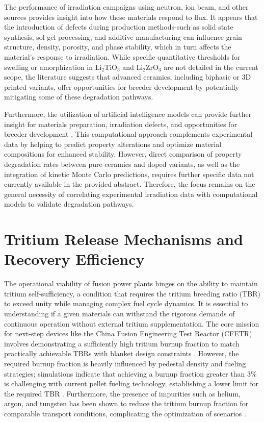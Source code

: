 \documentclass[review,12pt,a4paper]{elsarticle}
\begin{document}
\textcolor{medconf}{The performance of irradiation campaigns using neutron, ion beam, and other sources provides insight into how these materials respond to flux. It appears that the introduction of defects during production methods-such as solid state synthesis, sol-gel processing, and additive manufacturing-can influence grain structure, density, porosity, and phase stability, which in turn affects the material's response to irradiation. While specific quantitative thresholds for swelling or amorphization in $\mathrm{Li}_2\mathrm{TiO}_3$ and $\mathrm{Li}_2\mathrm{ZrO}_3$ are not detailed in the current scope, the literature suggests that advanced ceramics, including biphasic or 3D printed variants, offer opportunities for breeder development by potentially mitigating some of these degradation pathways.}

\textcolor{highconf}{Furthermore, the utilization of artificial intelligence models can provide further insight for materials preparation, irradiation defects, and opportunities for breeder development \citep{ruegsegger_scoping_2023}. This computational approach complements experimental data by helping to predict property alterations and optimize material compositions for enhanced stability. However, direct comparison of property degradation rates between pure ceramics and doped variants, as well as the integration of kinetic Monte Carlo predictions, requires further specific data not currently available in the provided abstract. Therefore, the focus remains on the general necessity of correlating experimental irradiation data with computational models to validate degradation pathways.}

\section{Tritium Release Mechanisms and Recovery Efficiency}


\textcolor{highconf}{The operational viability of fusion power plants hinges on the ability to maintain tritium self-sufficiency, a condition that requires the tritium breeding ratio (TBR) to exceed unity while managing complex fuel cycle dynamics. It is essential to understanding if a given materials can withstand the rigorous demands of continuous operation without external tritium supplementation. The core mission for next-step devices like the China Fusion Engineering Test Reactor (CFETR) involves demonstrating a sufficiently high tritium burnup fraction to match practically achievable TBRs with blanket design constraints \citep{kinjyo_tritium_2004}. However, the required burnup fraction is heavily influenced by pedestal density and fueling strategies; simulations indicate that achieving a burnup fraction greater than 3\% is challenging with current pellet fueling technology, establishing a lower limit for the required TBR \citep{kinjyo_tritium_2004}. Furthermore, the presence of impurities such as helium, argon, and tungsten has been shown to reduce the tritium burnup fraction for comparable transport conditions, complicating the optimization of scenarios \citep{kinjyo_tritium_2004}.}
\end{document}
